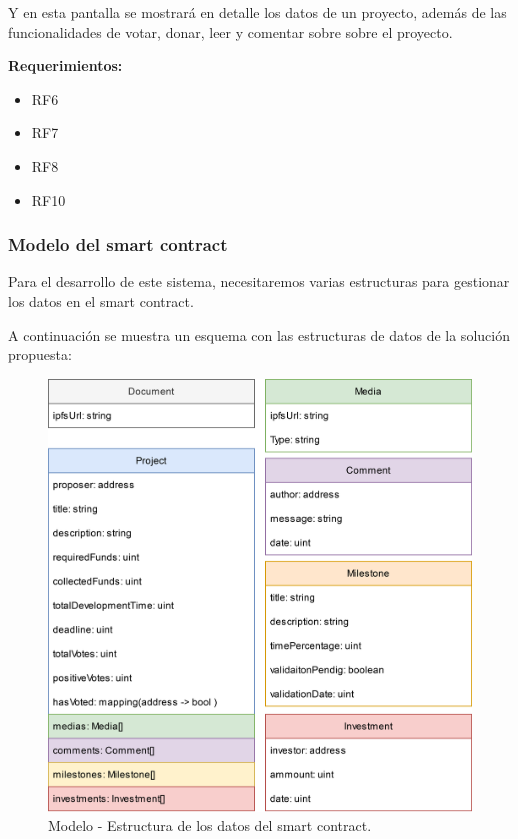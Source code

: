 Y en esta pantalla se mostrará en detalle los datos de un proyecto, además de las funcionalidades de votar, donar, leer y comentar sobre sobre el proyecto.

\bigskip

\textbf{Requerimientos: }
\begin{itemize}
    \item RF6
    \item RF7
    \item RF8
    \item RF10
\end{itemize}

\newpage

\subsubsection{Modelo del smart contract}

Para el desarrollo de este sistema, necesitaremos varias estructuras para gestionar los datos en el smart contract.

\bigskip

A continuación se muestra un esquema con las estructuras de datos de la solución propuesta:

\begin{figure}[H]
        \centering
        \includegraphics[width=1\textwidth]{img/diagramas/estructuras.png}
        \caption{Modelo - Estructura de los datos del smart contract.}
        \label{fig:configApi}
\end{figure}


